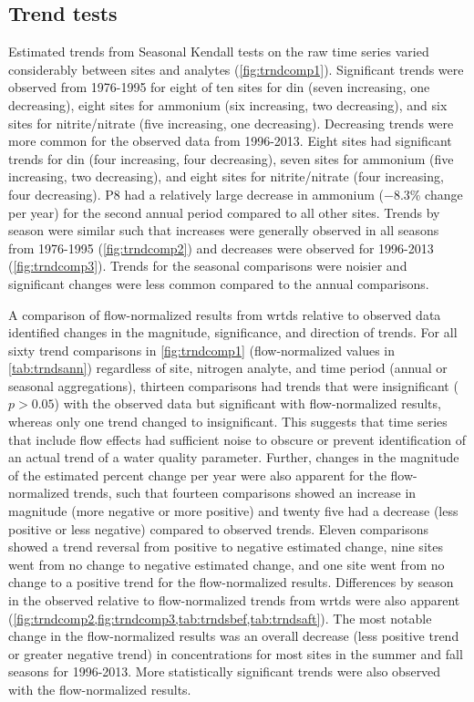 \documentclass[letterpaper,12pt,oneside]{article}\usepackage[]{graphicx}\usepackage[]{color}
\begin{document}
\subsection{Trend tests}



Estimated trends from Seasonal Kendall tests on the raw time series varied considerably between sites and analytes (\cref{fig:trndcomp1}). Significant trends were observed from 1976-1995 for eight of ten sites for \ac{din} (seven increasing, one decreasing), eight sites for ammonium (six increasing, two decreasing), and six sites for nitrite/nitrate (five increasing, one decreasing).  Decreasing trends were more common for the observed data from 1996-2013.  Eight sites had significant trends for \ac{din} (four increasing, four decreasing), seven sites for ammonium (five increasing, two decreasing), and eight sites for nitrite/nitrate (four increasing, four decreasing). P8 had a relatively large decrease in ammonium ($-8.3$\% change per year) for the second annual period compared to all other sites. Trends by season were similar such that increases were generally observed in all seasons from 1976-1995 (\cref{fig:trndcomp2}) and decreases were observed for 1996-2013 (\cref{fig:trndcomp3}).  Trends for the seasonal comparisons were noisier and significant changes were less common compared to the annual comparisons.


A comparison of flow-normalized results from \ac{wrtds} relative to observed data identified changes in the magnitude, significance, and direction of trends. For all sixty trend comparisons in \cref{fig:trndcomp1} (flow-normalized values in \cref{tab:trndsann}) regardless of site, nitrogen analyte, and time period (annual or seasonal aggregations), thirteen comparisons had trends that were insignificant ($p > 0.05$) with the observed data but significant with flow-normalized results, whereas only one trend changed to insignificant. This suggests that time series that include flow effects had sufficient noise to obscure or prevent identification of an actual trend of a water quality parameter. Further, changes in the magnitude of the estimated percent change per year were also apparent for the flow-normalized trends, such that fourteen comparisons showed an increase in magnitude (more negative or more positive) and twenty five had a decrease (less positive or less negative) compared to observed trends.  Eleven comparisons showed a trend reversal from positive to negative estimated change, nine sites went from no change to negative estimated change, and one site went from no change to a positive trend for the flow-normalized results. Differences by season in the observed relative to flow-normalized trends from \ac{wrtds} were also apparent (\cref{fig:trndcomp2,fig:trndcomp3,tab:trndsbef,tab:trndsaft}). The most notable change in the flow-normalized results was an overall decrease (less positive trend or greater negative trend) in concentrations for most sites in the summer and fall seasons for 1996-2013.  More statistically significant trends were also observed with the flow-normalized results.
\end{document}

